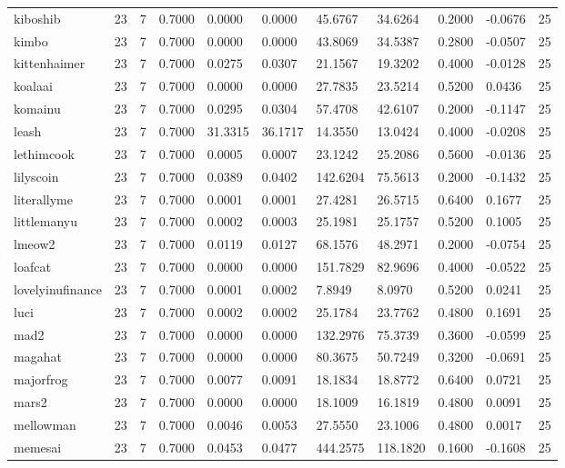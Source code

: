 \begin{table}[htbp]
\begin{tabular}{lllllllllll}
kiboshib & 23 & 7 & 0.7000 & 0.0000 & 0.0000 & 45.6767 & 34.6264 & 0.2000 & -0.0676 & 25 \\
kimbo & 23 & 7 & 0.7000 & 0.0000 & 0.0000 & 43.8069 & 34.5387 & 0.2800 & -0.0507 & 25 \\
kittenhaimer & 23 & 7 & 0.7000 & 0.0275 & 0.0307 & 21.1567 & 19.3202 & 0.4000 & -0.0128 & 25 \\
koalaai & 23 & 7 & 0.7000 & 0.0000 & 0.0000 & 27.7835 & 23.5214 & 0.5200 & 0.0436 & 25 \\
komainu & 23 & 7 & 0.7000 & 0.0295 & 0.0304 & 57.4708 & 42.6107 & 0.2000 & -0.1147 & 25 \\
leash & 23 & 7 & 0.7000 & 31.3315 & 36.1717 & 14.3550 & 13.0424 & 0.4000 & -0.0208 & 25 \\
lethimcook & 23 & 7 & 0.7000 & 0.0005 & 0.0007 & 23.1242 & 25.2086 & 0.5600 & -0.0136 & 25 \\
lilyscoin & 23 & 7 & 0.7000 & 0.0389 & 0.0402 & 142.6204 & 75.5613 & 0.2000 & -0.1432 & 25 \\
literallyme & 23 & 7 & 0.7000 & 0.0001 & 0.0001 & 27.4281 & 26.5715 & 0.6400 & 0.1677 & 25 \\
littlemanyu & 23 & 7 & 0.7000 & 0.0002 & 0.0003 & 25.1981 & 25.1757 & 0.5200 & 0.1005 & 25 \\
lmeow2 & 23 & 7 & 0.7000 & 0.0119 & 0.0127 & 68.1576 & 48.2971 & 0.2000 & -0.0754 & 25 \\
loafcat & 23 & 7 & 0.7000 & 0.0000 & 0.0000 & 151.7829 & 82.9696 & 0.4000 & -0.0522 & 25 \\
lovelyinufinance & 23 & 7 & 0.7000 & 0.0001 & 0.0002 & 7.8949 & 8.0970 & 0.5200 & 0.0241 & 25 \\
luci & 23 & 7 & 0.7000 & 0.0002 & 0.0002 & 25.1784 & 23.7762 & 0.4800 & 0.1691 & 25 \\
mad2 & 23 & 7 & 0.7000 & 0.0000 & 0.0000 & 132.2976 & 75.3739 & 0.3600 & -0.0599 & 25 \\
magahat & 23 & 7 & 0.7000 & 0.0000 & 0.0000 & 80.3675 & 50.7249 & 0.3200 & -0.0691 & 25 \\
majorfrog & 23 & 7 & 0.7000 & 0.0077 & 0.0091 & 18.1834 & 18.8772 & 0.6400 & 0.0721 & 25 \\
mars2 & 23 & 7 & 0.7000 & 0.0000 & 0.0000 & 18.1009 & 16.1819 & 0.4800 & 0.0091 & 25 \\
mellowman & 23 & 7 & 0.7000 & 0.0046 & 0.0053 & 27.5550 & 23.1006 & 0.4800 & 0.0017 & 25 \\
memesai & 23 & 7 & 0.7000 & 0.0453 & 0.0477 & 444.2575 & 118.1820 & 0.1600 & -0.1608 & 25 \\

\end{tabular}
\end{table}
